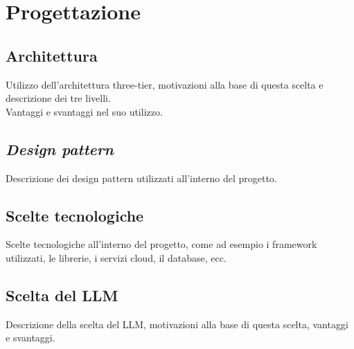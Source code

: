 \section{Progettazione}
\label{sez:progettazione}

\subsection{Architettura}
\label{subsec:architettura}

Utilizzo dell'architettura three-tier, motivazioni alla base di questa scelta e descrizione dei tre livelli. \\
Vantaggi e svantaggi nel suo utilizzo.

\subsection{\textit{Design pattern}}
\label{subsec:design-pattern}

Descrizione dei design pattern utilizzati all'interno del progetto.

\subsection{Scelte tecnologiche}
\label{subsec:scelte-tecnologiche}

Scelte tecnologiche all'interno del progetto, come ad esempio i framework utilizzati, le librerie, i servizi cloud, il database, ecc.

\subsection{Scelta del LLM}
\label{subsec:scelta-llm}

Descrizione della scelta del LLM, motivazioni alla base di questa scelta, vantaggi e svantaggi.